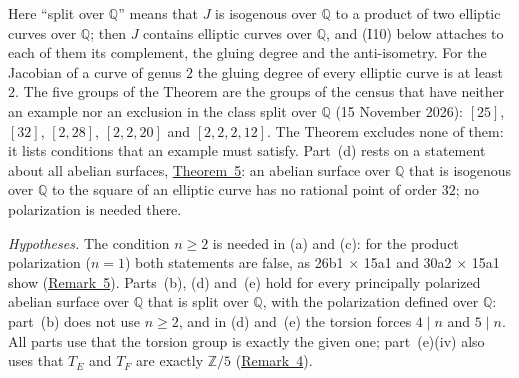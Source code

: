 \documentclass[11pt]{article}
\newcommand{\Q}{\mathbb Q}
\newcommand{\Z}{\mathbb Z}
\begin{document}
Here ``split over \(\Q\)'' means that \(J\) is isogenous over \(\Q\) to a product of two elliptic curves over \(\Q\);
then \(J\) contains elliptic curves over \(\Q\), and (I10) below attaches to each of them its complement, the gluing
degree and the anti-isometry. For the Jacobian of a curve of genus \(2\) the gluing degree of every elliptic curve
is at least \(2\). The five groups of the Theorem are the groups of the census that have neither an example nor an
exclusion in the class split over \(\Q\) (15 November 2026):
\href{https://genus-2-torsion.github.io/group.html?g=25}{\([25]\)},
\href{https://genus-2-torsion.github.io/group.html?g=32}{\([32]\)},
\href{https://genus-2-torsion.github.io/group.html?g=2.28}{\([2,28]\)},
\href{https://genus-2-torsion.github.io/group.html?g=2.2.20}{\([2,2,20]\)} and
\href{https://genus-2-torsion.github.io/group.html?g=2.2.2.12}{\([2,2,2,12]\)}. The Theorem excludes none of them:
it lists conditions that an example must satisfy. Part~(d) rests on a statement about all abelian surfaces,
\hyperref[thm-isotypic]{Theorem~5}: an abelian surface over \(\Q\) that is isogenous over \(\Q\) to the square of an
elliptic curve has no rational point of order \(32\); no polarization is needed there.

\emph{Hypotheses.} The condition \(n\ge2\) is needed in (a) and (c): for the product polarization (\(n=1\)) both
statements are false, as 26b1 \(\times\) 15a1 and 30a2 \(\times\) 15a1 show (\hyperref[rem-products]{Remark~5}).
Parts~(b), (d) and~(e) hold for every principally polarized abelian surface over \(\Q\) that is split over \(\Q\),
with the polarization defined over \(\Q\): part~(b) does not use \(n\ge2\), and in (d) and~(e) the torsion forces
\(4\mid n\) and \(5\mid n\). All parts use that the torsion group is exactly the given one; part~(e)(iv) also uses
that \(T_E\) and \(T_F\) are exactly \(\Z/5\) (\hyperref[rem-trace]{Remark~4}).
\end{document}
